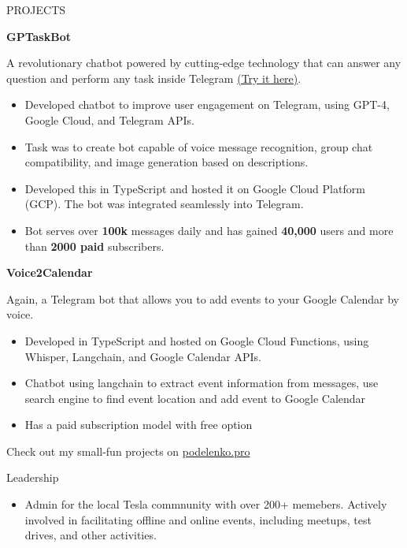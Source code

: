 \documentclass{template} %
\begin{document}
\begin{rSection}{PROJECTS}
\vspace{-1.25em}
\item \textbf{GPTaskBot} {A revolutionary chatbot powered by cutting-edge technology that can answer any question and perform any task inside Telegram \href{https://gptask.io/}{(Try it here)}.
    \begin{itemize}
        \itemsep -3pt {} 
        \item Developed chatbot to improve user engagement on Telegram, using GPT-4, Google Cloud, and Telegram APIs.
        \item Task was to create bot capable of voice message recognition, group chat compatibility, and image generation based on descriptions.
        \item Developed this in TypeScript and hosted it on Google Cloud Platform (GCP). The bot was integrated seamlessly into Telegram.
        \item Bot serves over \textbf{100k} messages daily and has gained \textbf{40,000} users and more than \textbf{2000 paid} subscribers.
    \end{itemize}
}
\item \textbf{Voice2Calendar} {Again, a Telegram bot that allows you to add events to your Google Calendar by voice.
    \begin{itemize}
        \itemsep -3pt {} 
        \item Developed in TypeScript and hosted on Google Cloud Functions, using Whisper, Langchain, and Google Calendar APIs.
        \item Chatbot using langchain to extract event information from messages, use search engine to find event location and add event to Google Calendar
        \item Has a paid subscription model with free option
    \end{itemize}
}
Check out my small-fun projects on \href{https://podelenko.pro/#fun}{podelenko.pro}
\end{rSection} 


\begin{rSection}{Leadership} 
\begin{itemize}
    \item Admin for the local Tesla commnunity with over 200+ memebers. Actively involved in facilitating offline and online events, including meetups, test drives, and other activities.
\end{itemize}


\end{rSection}
\end{document}
